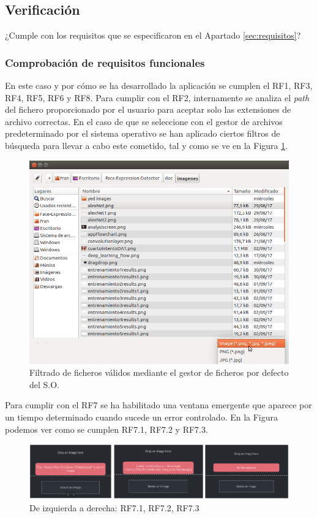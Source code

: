 \documentclass[a4paper,11pt]{book}
\begin{document}
\subsection{Verificación}
¿Cumple con los requisitos que se especificaron en el Apartado \ref{sec:requisitos}?\\
\subsubsection{Comprobación de requisitos funcionales}
En este caso y por cómo se ha desarrollado la aplicación se cumplen el RF1, RF3, RF4, RF5, RF6 y RF8. Para cumplir con el RF2, internamente se analiza el \textit{path} del fichero proporcionado por el usuario para aceptar solo las extensiones de archivo correctas. En el caso de que se seleccione con el gestor de archivos predeterminado por el sistema operativo se han aplicado ciertos filtros de búsqueda para llevar a cabo este cometido, tal y como se ve en la Figura \ref{fig:filters}.\\
\begin{figure}[h]
\centering
\includegraphics[width=0.7\linewidth]{imagenes/filters}
\caption[Filtros]{Filtrado de ficheros válidos mediante el gestor de ficheros por defecto del S.O.}
\label{fig:filters}
\end{figure}

Para cumplir con el RF7 se ha habilitado una ventana emergente que aparece por un tiempo determinado cuando sucede un error controlado. En la Figura podemos ver como se cumplen RF7.1, RF7.2 y RF7.3.\\

\begin{figure}[h]
\centering
\includegraphics[width=1.0\linewidth]{imagenes/RF7}
\caption[RF7]{De izquierda a derecha: RF7.1, RF7.2, RF7.3}
\label{fig:RF7}
\end{figure}
\end{document}
